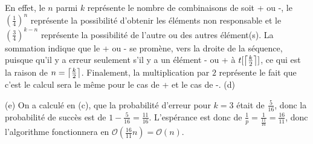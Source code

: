 \documentclass[12pt,letterpaper]{article}
\DeclarePairedDelimiter{\ceil}{\lceil}{\rceil}
\DeclarePairedDelimiter\floor{\lfloor}{\rfloor}
\newcommand{\algskip}{\vspace{3pt}}
\renewcommand{\O}{\mathcal{O}}
\begin{document}
En effet, le $n$ parmi $k$ représente le nombre de combinaisons de soit + ou -, le $(\frac{1}{4})^n$ représente la possibilité d'obtenir les éléments non responsable et le $(\frac{3}{4})^{k-n}$ représente la possibilité de l'autre ou des autres élément(s). La sommation indique que le + ou - se promène, vers la droite de la séquence, puisque qu'il y a erreur seulement s'il y a un élément - ou + à $t[\ceil*{\frac{k}{2}}]$, ce qui est la raison de $n = \ceil*{\frac{k}{2}}$. Finalement, la multiplication par $2$ représente le fait que c'est le calcul sera le même pour le cas de + et le cas de -.
\newpage
(d)\newline
\begin{algorithm}[H]
\DontPrintSemicolon
\LinesNumbered
{}
\algskip

\end{algorithm}

(e) On a calculé en (c), que la probabilité d'erreur pour $k=3$ était de $\frac{5}{16}$, donc la probabilité de succès est de $1 - \frac{5}{16} = \frac{11}{16}$. L'espérance est donc de $\frac{1}{p} = \frac{1}{\frac{11}{16}} = \frac{16}{11}$, donc l'algorithme fonctionnera en $\O(\frac{16}{11}n) = \O(n)$.
\end{document}
